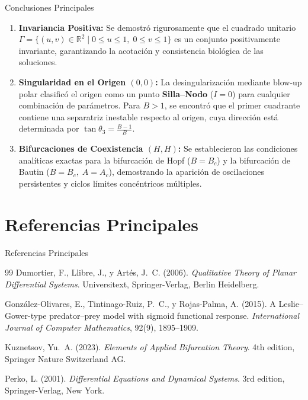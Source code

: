 \documentclass[10pt, aspectratio=169]{beamer}
\begin{document}
	\begin{frame}{Conclusiones Principales}
		\begin{enumerate}
			\item \textbf{Invariancia Positiva:} Se demostró rigurosamente que el cuadrado unitario $\Gamma = \{ (u,v) \in \mathbb{R}^2 \mid 0 \le u \le 1, \; 0 \le v \le 1 \}$ es un conjunto positivamente invariante, garantizando la acotación y consistencia biológica de las soluciones.
			\item \textbf{Singularidad en el Origen $(0,0)$:} La desingularización mediante blow-up polar clasificó el origen como un punto \textbf{Silla--Nodo} ($I=0$) para cualquier combinación de parámetros. Para $B > 1$, se encontró que el primer cuadrante contiene una separatriz inestable respecto al origen, cuya dirección está determinada por $\tan\theta_3 = \frac{B-1}{B}$.
			\item \textbf{Bifurcaciones de Coexistencia $(H,H)$:} Se establecieron las condiciones analíticas exactas para la bifurcación de Hopf ($B = B_c$) y la bifurcación de Bautin ($B = B_c, \; A = A_c$), demostrando la aparición de oscilaciones persistentes y ciclos límites concéntricos múltiples.
		\end{enumerate}
	\end{frame}
	
	\section{Referencias Principales}
	
	\begin{frame}{Referencias Principales}
		\begin{thebibliography}{99}
			Dumortier, F., Llibre, J., y Artés, J.~C. (2006).
			\newblock \emph{Qualitative Theory of Planar Differential Systems}.
			\newblock Universitext, Springer-Verlag, Berlin Heidelberg.
			
			González-Olivares, E., Tintinago-Ruiz, P.~C., y Rojas-Palma, A. (2015).
			\newblock A Leslie--Gower-type predator--prey model with sigmoid functional response.
			\newblock \emph{International Journal of Computer Mathematics}, 92(9), 1895--1909.
			
			Kuznetsov, Yu.~A. (2023).
			\newblock \emph{Elements of Applied Bifurcation Theory}.
			\newblock 4th edition, Springer Nature Switzerland AG.
			
			Perko, L. (2001).
			\newblock \emph{Differential Equations and Dynamical Systems}.
			\newblock 3rd edition, Springer-Verlag, New York.
		\end{thebibliography}
	\end{frame}
	
\end{document}
